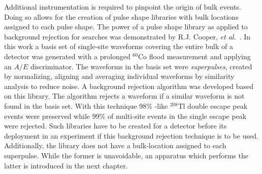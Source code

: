 Additional instrumentation is required to pinpoint the origin of bulk events. Doing so allows for the creation of pulse shape libraries with bulk locations assigned to each pulse shape. The power of a pulse shape library as applied to background rejection for \novbb{} searches was demonstrated by R.J. Cooper, \textit{et al.}~\cite{mjd_pulseshape_library}. In this work a basis set of single-site waveforms covering the entire bulk of a detector was generated with a prolonged $^{60}$Co flood measurement and applying an $A/E$ discriminator. The waveforms in the basis set were \textit{superpulses}, created by normalizing, aligning and averaging individual waveforms by similarity analysis to reduce noise. A background rejection algorithm was developed based on this library. The algorithm rejects a waveform if a similar waveform is not found in the basis set. With this technique 98\% \novbb-like $^{208}$Tl double escape peak events were preserved while 99\% of multi-site events in the single escape peak were rejected. Such libraries have to be created for a detector before its deployment in an experiment if this background rejection technique is to be used. Additionally, the library does not have a bulk-location assigned to each superpulse. While the former is unavoidable, an apparatus which performs the latter is introduced in the next chapter.
